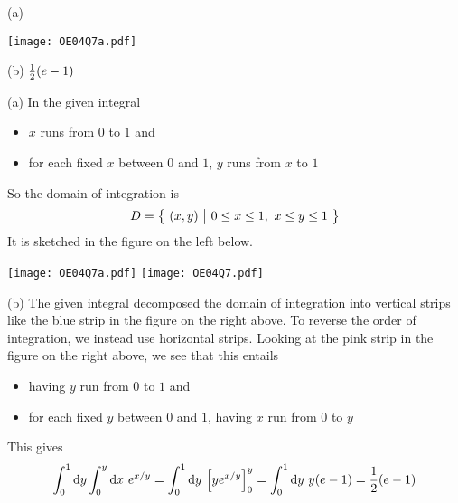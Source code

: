 %

\begin{answer}
(a)

\begin{center}
     \texttt{[image: OE04Q7a.pdf]}
\end{center}

(b) $\tfrac{1}{2}(e-1)$
\end{answer}

\begin{solution}
(a) In the given integral
\begin{itemize}
\item 
  $x$ runs from $0$ to $1$ and
\item
  for each fixed $x$ between $0$ and $1$, $y$ runs from $x$ to $1$ 
\end{itemize}
So the domain of integration is 
\begin{equation*}
D = \big\{ \ (x,y)\ \big|\ 0\le x\le 1,\ x\le y\le 1\ \big\}
\end{equation*}
It is sketched in the figure on the left below.

\begin{center}
     \texttt{[image: OE04Q7a.pdf]}\qquad
     \texttt{[image: OE04Q7.pdf]}
\end{center}


(b) The given integral decomposed the domain of integration into 
vertical strips like the blue strip in the figure on the right above. 
To reverse the order of integration, we instead use horizontal strips. 
Looking at the pink strip in the figure on the right above, we see that 
this entails
\begin{itemize}
\item 
  having $y$ run from $0$ to $1$ and
\item
  for each fixed $y$ between $0$ and $1$, having $x$ run from $0$ to $y$ 
\end{itemize}
This gives
\begin{equation*}
\int_0^1\mathrm{d}y\int_0^y \mathrm{d}x\ e^{x/y}=\int_0^1\mathrm{d}y\ \Big[ye^{x/y}\Big]_0^y
=\int_0^1\mathrm{d}y\ y(e-1)
=\frac{1}{2} (e-1)
\end{equation*}
\end{solution}

